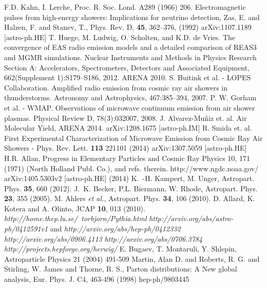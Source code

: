 \begin{thebibliography}{1}
 F.D. Kahn, I. Lerche, Proc. R. Soc. Lond. A289 (1966) 206.
 Electromagnetic pulses from high-energy showers: Implications for neutrino detection, Zas, E. and Halzen, F. and Stanev, T., Phys. Rev. D, \textbf{45}, 362--376, (1992)
 arXiv:1107.1189 [astro-ph.HE]
 T. Huege, M. Ludwig, O. Scholten, and K.D. de Vries. The convergence of EAS radio emission models and a detailed comparison of REAS3 and MGMR simulations. Nuclear Instruments and Methods in Physics Research Section A: Accelerators, Spectrometers, Detectors and Associated Equipment, 662(Supplement 1):S179–S186, 2012. ARENA 2010.
 S. Buitink et al. - LOPES Collaboration. Amplified radio emission from cosmic ray air showers in thunderstorms. Astronomy and Astrophysics, 467:385–394, 2007.
 P. W. Gorham et al. - WMAP. Observations of microwave continuum emission from air shower plasmas. Physical Review D, 78(3):032007, 2008.
 J. Alvarez-Mu\~niz et. al. Air Molecular Yield, ARENA 2014.
 arXiv:1208.1675 [astro-ph.IM]
 R. Smida et. al. First Experimental Characterization of Microwave Emission from Cosmic Ray Air Showers - Phys. Rev. Lett. \textbf{113} 221101 (2014)
 arXiv:1307.5059 [astro-ph.HE]
 H.R. Allan, Progress in Elementary Particles and Cosmic Ray Physics 10, 171 (1971) (North Holland Publ. Co.), and refs. therein.
 http://www.ngdc.noaa.gov/
 arXiv:1405.5303v2 [astro-ph.HE] (2014)
 K.~-H. Kampert, M. Unger, Astropart. Phys. {\bf 35}, 660 (2012).  
 J.~K. Becker, P.L. Biermann, W. Rhode, Astropart. Phys. {\bf 23}, 355 (2005).
 M. Ahlers {\it et al.}, Astropart. Phys. {\bf 34}, 106 (2010).
 D. Allard, K. Kotera and A. Olinto, JCAP {\bf 10}, 013 (2010).
 \emph{http://home.thep.lu.se/~torbjorn/Pythia.html}
 \emph{http://arxiv.org/abs/astro-ph/0412591v1} and \emph{http://arxiv.org/abs/hep-ph/0412332}
 \emph{http://arxiv.org/abs/0906.4113}
 \emph{http://arxiv.org/abs/0706.3784}
 \emph{http://projects.hepforge.org/herwig/}
 E. Bugaev, T. Montaruli, Y. Shlepin, Astroparticle Physics 21 (2004) 491-509
 Martin, Alan D. and Roberts, R. G. and Stirling, W. James and Thorne, R. S., Parton distributions: A New global analysis, Eur. Phys. J. C4, 463-496 (1998) hep-ph/9803445

\end{thebibliography}
